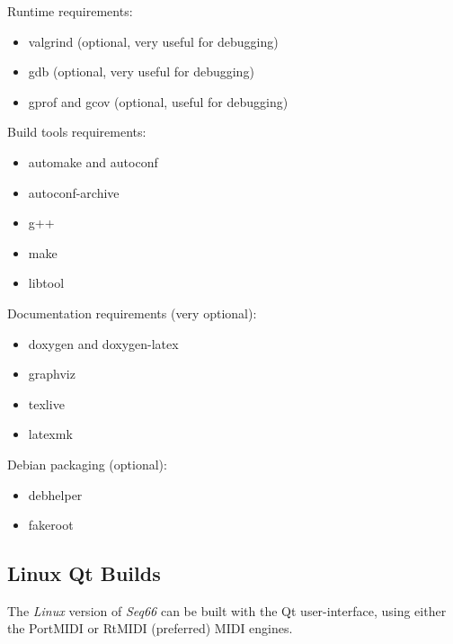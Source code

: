    Runtime requirements:

     \begin{itemize}
        \item valgrind (optional, very useful for debugging)
        \item gdb (optional, very useful for debugging)
        \item gprof and gcov (optional, useful for debugging)
     \end{itemize}

   Build tools requirements:

     \begin{itemize}
        \item automake and autoconf
        \item autoconf-archive
        \item g++
        \item make
        \item libtool
     \end{itemize}

   Documentation requirements (very optional):

     \begin{itemize}
        \item doxygen and doxygen-latex
        \item graphviz
        \item texlive
        \item latexmk
     \end{itemize}
      
   Debian packaging (optional):

     \begin{itemize}
        \item debhelper
        \item fakeroot
     \end{itemize}

\subsection{Linux Qt Builds}
\label{subsec:build_Qt}

   The \textsl{Linux} version of \textsl{Seq66} can be built with the Qt
   user-interface, using either the PortMIDI or RtMIDI (preferred) MIDI
   engines.
 
